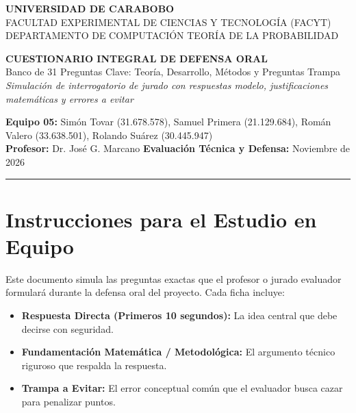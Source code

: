 \documentclass[11pt,letterpaper]{article}
\begin{document}
\begin{center}
    {\large \textbf{UNIVERSIDAD DE CARABOBO}}\\[2pt]
    {\normalsize FACULTAD EXPERIMENTAL DE CIENCIAS Y TECNOLOGÍA (FACYT)}\\[2pt]
    {\normalsize DEPARTAMENTO DE COMPUTACIÓN \textperiodcentered{} TEORÍA DE LA PROBABILIDAD}\\[10pt]
    
    \begin{tcolorbox}[colback=blue!8!white, colframe=blue!60!black, arc=3mm, width=\linewidth, halign=center]
        \vspace{4pt}
        {\Large \bfseries CUESTIONARIO INTEGRAL DE DEFENSA ORAL}\\[4pt]
        {\large Banco de 31 Preguntas Clave: Teoría, Desarrollo, Métodos y Preguntas Trampa}\\[4pt]
        {\small \textit{Simulación de interrogatorio de jurado con respuestas modelo, justificaciones matemáticas y errores a evitar}}
        \vspace{4pt}
    \end{tcolorbox}
    \vspace{6pt}
    
    \textbf{Equipo 05:} Simón Tovar (31.678.578), Samuel Primera (21.129.684), Román Valero (33.638.501), Rolando Suárez (30.445.947)\\[2pt]
    \textbf{Profesor:} Dr. José G. Marcano \textperiodcentered{} \textbf{Evaluación Técnica y Defensa:} Noviembre de 2026
\end{center}

\vspace{5pt}
\hrule
\vspace{10pt}

\section*{Instrucciones para el Estudio en Equipo}
Este documento simula las preguntas exactas que el profesor o jurado evaluador formulará durante la defensa oral del proyecto. Cada ficha incluye:
\begin{itemize}[leftmargin=*, nosep]
    \item \textbf{Respuesta Directa (Primeros 10 segundos):} La idea central que debe decirse con seguridad.
    \item \textbf{Fundamentación Matemática / Metodológica:} El argumento técnico riguroso que respalda la respuesta.
    \item \textbf{Trampa a Evitar:} El error conceptual común que el evaluador busca cazar para penalizar puntos.
\end{itemize}
\end{document}
